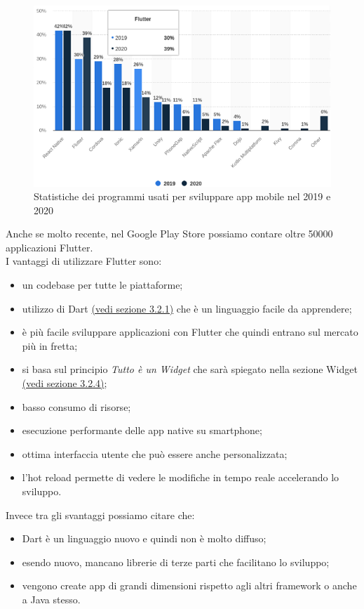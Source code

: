 \begin{figure}[htbp]	
	\centering
	\includegraphics[width=12cm]{immagini/statisticheflutter.png}
	\caption{Statistiche dei programmi usati per sviluppare app mobile nel 2019 e 2020 \cite{stat}}
	\label{fig:Statistiche dei programmi usati per sviluppare app mobile nel 2019 e 2020} 
\end{figure}

\newpage

\noindent Anche se molto recente, nel Google Play Store possiamo contare oltre 50000 applicazioni Flutter.\\
I vantaggi di utilizzare Flutter sono:
\begin{itemize}
	\item un codebase per tutte le piattaforme; 
	\item utilizzo di Dart \hyperref[sec:Dart]{(vedi sezione 3.2.1)} che è un linguaggio facile da apprendere;  
	\item è più facile sviluppare applicazioni con Flutter che quindi entrano sul mercato più in fretta;
	\item si basa sul principio \textit{Tutto è un Widget} che sarà spiegato nella sezione Widget \hyperref[sec:Widget]{(vedi sezione 3.2.4)};
	\item basso consumo di risorse;
	\item esecuzione performante delle app native su smartphone;
	\item ottima interfaccia utente che può essere anche personalizzata;
	\item l’hot reload permette di vedere le modifiche in tempo reale accelerando lo sviluppo.\\
\end{itemize}
Invece tra gli svantaggi possiamo citare che:
\begin{itemize}
	\item Dart è un linguaggio nuovo e quindi non è molto diffuso; 
	\item esendo nuovo, mancano librerie di terze parti che facilitano lo sviluppo;  
	\item vengono create app di grandi dimensioni rispetto agli altri framework o anche a Java stesso.\\
\end{itemize}
